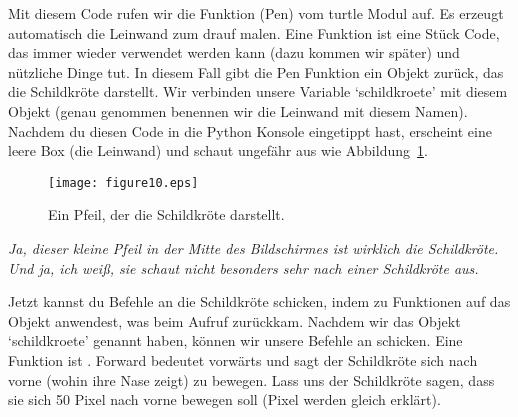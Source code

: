 Mit diesem Code rufen wir die Funktion (Pen) vom turtle Modul auf. Es erzeugt automatisch die Leinwand zum drauf malen. Eine Funktion ist eine Stück Code, das immer wieder verwendet werden kann (dazu kommen wir später) und nützliche Dinge tut. In diesem Fall gibt die Pen Funktion ein Objekt zurück, das die Schildkröte darstellt. Wir verbinden unsere Variable `schildkroete' mit diesem Objekt (genau genommen benennen wir die Leinwand mit diesem Namen). Nachdem du diesen Code in die Python Konsole eingetippt hast, erscheint eine leere Box (die Leinwand) und schaut ungefähr aus wie Abbildung~\ref{fig10}.


\begin{figure}
\begin{center}
\texttt{[image: figure10.eps]}
\end{center}
\caption{Ein Pfeil, der die Schildkröte darstellt.}\label{fig10}
\end{figure}

\emph{Ja, dieser kleine Pfeil in der Mitte des Bildschirmes ist wirklich die Schildkröte. Und ja, ich weiß, sie schaut nicht besonders sehr nach einer Schildkröte aus.}


Jetzt kannst du Befehle an die Schildkröte schicken, indem zu Funktionen auf das Objekt anwendest, was beim  Aufruf zurückkam. Nachdem wir das Objekt `schildkroete' genannt haben, können wir unsere Befehle an  schicken. 
Eine Funktion ist  . Forward bedeutet vorwärts und sagt der Schildkröte sich nach vorne (wohin ihre Nase zeigt) zu bewegen. Lass uns der Schildkröte sagen, dass sie sich 50 Pixel nach vorne bewegen soll (Pixel werden gleich erklärt).

